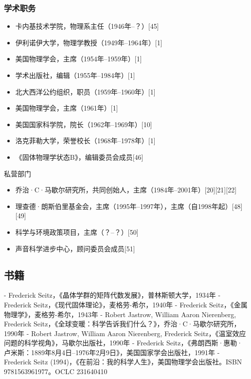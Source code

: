 \subsubsection{学术职务}
\begin{itemize}
\item 卡内基技术学院，物理系主任（1946年–？）[45]  
\item 伊利诺伊大学，物理学教授（1949年–1964年）[1]  
\item 美国物理学会，主席（1954年–1959年）[1]  
\item 学术出版社，编辑（1955年–1984年）[1]  
\item 北大西洋公约组织，职员（1959年–1960年）[1]  
\item 美国物理学会，主席（1961年）[1]  
\item 美国国家科学院，院长（1962年–1969年）[10]  
\item 洛克菲勒大学，荣誉校长（1968年–1978年）[1]  
\item 《固体物理学状态B》，编辑委员会成员[46]
\end{itemize}
私营部门
\begin{itemize}
\item 乔治·C·马歇尔研究所，共同创始人，主席（1984年–2001年）[20][21][22]  
\item 理查德·朗斯伯里基金会，主席（1995年–1997年），主席（自1998年起）[48][49]  
\item 科学与环境政策项目，主席（？–？）[50]  
\item 声音科学进步中心，顾问委员会成员[51]
\end{itemize}
\subsection{书籍}

- Frederick Seitz，《晶体学群的矩阵代数发展》，普林斯顿大学，1934年  
- Frederick Seitz，《现代固体理论》，麦格劳-希尔，1940年  
- Frederick Seitz，《金属物理学》，麦格劳-希尔，1943年  
- Robert Jastrow, William Aaron Nierenberg, Frederick Seitz，《全球变暖：科学告诉我们什么？》，乔治·C·马歇尔研究所，1990年  
- Robert Jastrow, William Aaron Nierenberg, Frederick Seitz，《温室效应问题的科学视角》，马歇尔出版社，1990年  
- Frederick Seitz，《弗朗西斯·惠勒·卢米斯：1889年8月4日–1976年2月9日》，美国国家学会出版社，1991年  
- Frederick Seitz (1994)，《在前沿：我的科学人生》，美国物理学会出版社。ISBN 9781563961977。OCLC 231640410